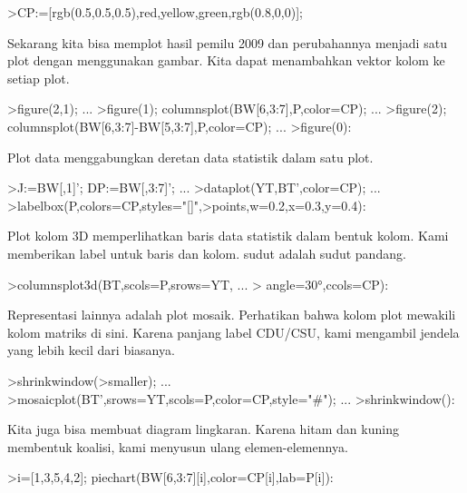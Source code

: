 \documentclass{article}
\begin{document}
\begin{eulernotebook}
\begin{eulercomment}
\begin{eulercomment}
\begin{eulerprompt}
>CP:=[rgb(0.5,0.5,0.5),red,yellow,green,rgb(0.8,0,0)];
\end{eulerprompt}
\begin{eulercomment}
Sekarang kita bisa memplot hasil pemilu 2009 dan perubahannya menjadi
satu plot dengan menggunakan gambar. Kita dapat menambahkan vektor
kolom ke setiap plot.
\end{eulercomment}
\begin{eulerprompt}
>figure(2,1);  ...
>figure(1); columnsplot(BW[6,3:7],P,color=CP); ...
>figure(2); columnsplot(BW[6,3:7]-BW[5,3:7],P,color=CP);  ...
>figure(0):
\end{eulerprompt}
\begin{eulercomment}
Plot data menggabungkan deretan data statistik dalam satu plot.
\end{eulercomment}
\begin{eulerprompt}
>J:=BW[,1]'; DP:=BW[,3:7]'; ...
>dataplot(YT,BT',color=CP);  ...
>labelbox(P,colors=CP,styles="[]",>points,w=0.2,x=0.3,y=0.4):
\end{eulerprompt}
\begin{eulercomment}
Plot kolom 3D memperlihatkan baris data statistik dalam bentuk kolom.
Kami memberikan label untuk baris dan kolom. sudut adalah sudut
pandang.
\end{eulercomment}
\begin{eulerprompt}
>columnsplot3d(BT,scols=P,srows=YT, ...
>  angle=30°,ccols=CP):
\end{eulerprompt}
\begin{eulercomment}
Representasi lainnya adalah plot mosaik. Perhatikan bahwa kolom plot
mewakili kolom matriks di sini. Karena panjang label CDU/CSU, kami
mengambil jendela yang lebih kecil dari biasanya.
\end{eulercomment}
\begin{eulerprompt}
>shrinkwindow(>smaller);  ...
>mosaicplot(BT',srows=YT,scols=P,color=CP,style="#"); ...
>shrinkwindow():
\end{eulerprompt}
\begin{eulercomment}
Kita juga bisa membuat diagram lingkaran. Karena hitam dan kuning
membentuk koalisi, kami menyusun ulang elemen-elemennya.
\end{eulercomment}
\begin{eulerprompt}
>i=[1,3,5,4,2]; piechart(BW[6,3:7][i],color=CP[i],lab=P[i]):
\end{eulerprompt}
\begin{eulercomment}

\end{eulercomment}
\end{eulercomment}
\end{eulercomment}
\end{eulernotebook}
\end{document}
